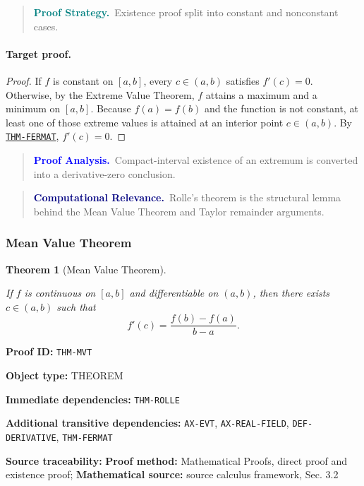 \documentclass[10pt]{article}
\newcommand{\pidraw}[1]{\begingroup\urlstyle{tt}\nolinkurl{#1}\endgroup}
\newcommand{\pidref}[1]{\hyperref[prf:#1]{\pidraw{#1}}}
\newcommand{\pid}[1]{\pidref{#1}}
\newtheorem{theorem}{Theorem}[section]
\theoremstyle{definition}
\theoremstyle{remark}
\newenvironment{proofstrategy}
{\begin{quote}\small\noindent\textbf{\textcolor{teal}{Proof Strategy.}}\ }
{\end{quote}}
\newenvironment{proofanalysis}
{\begin{quote}\small\noindent\textbf{\textcolor{blue}{Proof Analysis.}}\ }
{\end{quote}}
\newenvironment{computationalrelevance}
{\begin{quote}\small\noindent\textbf{\textcolor{navy}{Computational Relevance.}}\ }
{\end{quote}}
\newcommand{\meta}[2]{\noindent\textbf{#1:} #2\par}
\begin{document}
\begin{proofstrategy}Existence proof split into constant and nonconstant cases.\end{proofstrategy}

\paragraph{Target proof.}

\begin{proof}

If $f$ is constant on $[a,b]$, every $c\in(a,b)$ satisfies $f'(c)=0$.
Otherwise, by the Extreme Value Theorem, $f$ attains a maximum and a minimum
on $[a,b]$. Because $f(a)=f(b)$ and the function is not constant, at least one
of those extreme values is attained at an interior point $c\in(a,b)$.
By \pid{THM-FERMAT}, $f'(c)=0$.

\end{proof}

\begin{proofanalysis}Compact-interval existence of an extremum is converted into a derivative-zero conclusion.\end{proofanalysis}

\begin{computationalrelevance}Rolle's theorem is the structural lemma behind the Mean Value Theorem and Taylor remainder arguments.\end{computationalrelevance}

\subsubsection{Mean Value Theorem}

\begin{theorem}[Mean Value Theorem]\label{prf:THM-MVT}

If $f$ is continuous on $[a,b]$ and differentiable on $(a,b)$, then there exists $c\in(a,b)$ such that
\[
f'(c)=\frac{f(b)-f(a)}{b-a}.
\]

\end{theorem}

\meta{Proof ID}{\pidraw{THM-MVT}}
\meta{Object type}{THEOREM}
\meta{Immediate dependencies}{\pidraw{THM-ROLLE}}
\meta{Additional transitive dependencies}{\pidraw{AX-EVT}, \pidraw{AX-REAL-FIELD}, \pidraw{DEF-DERIVATIVE}, \pidraw{THM-FERMAT}}
\meta{Source traceability}{\textbf{Proof method:} Mathematical Proofs, direct proof and existence proof; \textbf{Mathematical source:} source calculus framework, Sec. 3.2}
\end{document}
